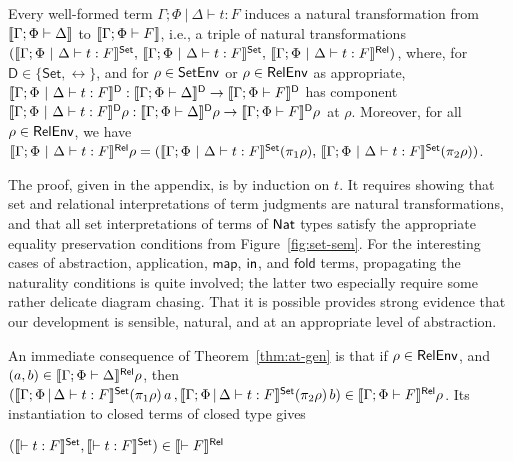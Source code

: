 \documentclass[runningheads]{llncs}
\newcommand{\set}{\mathsf{Set}}
\newcommand{\map}{\mathsf{map}}
\begin{document}
\vspace*{-0.05in}

\begin{theorem}\label{thm:at-gen}
Every well-formed term $\Gamma;\Phi~|~\Delta \vdash t : F$ induces a
natural transformation from $\llbracket{\Gamma; \Phi \vdash \Delta}\rrbracket$ to
$\llbracket{\Gamma; \Phi \vdash F}\rrbracket$, i.e., a triple of natural
transformations $(\setsem{\Gamma;\Phi~|~\Delta \vdash t : F},\,
\setsem{\Gamma;\Phi~|~\Delta \vdash t : F},\,
\relsem{\Gamma;\Phi~|~\Delta \vdash t : F})$, where, for $\mathsf D
\in \{\set,\rel\}$, and for $\rho \in \mathsf{SetEnv}$ or $\rho \in \mathsf{RelEnv}$ as
appropriate, $\llbracket{\Gamma;\Phi~|~\Delta \vdash t : F}\rrbracket^{\mathsf D} :
\llbracket{\Gamma; \Phi \vdash \Delta}\rrbracket^{\mathsf D} \to \llbracket{\Gamma; \Phi
  \vdash F}\rrbracket^{\mathsf D}$ has component $\llbracket{\Gamma;\Phi~|~\Delta
  \vdash t : F}\rrbracket^{\mathsf D}\rho : \llbracket{\Gamma; \Phi \vdash
  \Delta}\rrbracket^{\mathsf D}\rho \to \llbracket{\Gamma; \Phi \vdash F}\rrbracket^{\mathsf
  D}\rho$ at $\rho$. Moreover, for all $\rho \in \mathsf{RelEnv}$, we have
$\relsem{\Gamma;\Phi~|~\Delta \vdash t : F}\rho =
(\setsem{\Gamma;\Phi~|~\Delta \vdash t : F}(\pi_1 \rho),\,
\setsem{\Gamma;\Phi~|~\Delta \vdash t : F}(\pi_2 \rho))$.

\vspace*{-0.05in}

\end{theorem}
The proof, given in the appendix, is by induction on $t$. It requires
showing that set and relational interpretations of term judgments are
natural transformations, and that all set interpretations of terms of
$\mathsf{Nat}$ types satisfy the appropriate equality preservation conditions
from Figure~\ref{fig:set-sem}.  For the interesting cases of
abstraction, application, $\map$, $\mathsf{in}$, and $\mathsf{fold}$ terms,
propagating the naturality conditions is quite involved; the latter
two especially require some rather delicate diagram chasing. That it
is possible provides strong evidence that our development is sensible,
natural, and at an appropriate level of abstraction.

An immediate consequence of Theorem~\ref{thm:at-gen} is that
if $\rho \in \mathsf{RelEnv}$, and \,$(a, b) \in \llbracket{\Gamma; \Phi \vdash
  \Delta}\rrbracket^{\mathsf{Rel}} \rho$, then $(\setsem{\Gamma; \Phi \,|\, \Delta \vdash t :
  F} (\pi_1 \rho) \,a \, , \setsem{\Gamma; \Phi \,|\, \Delta \vdash t
  : F } (\pi_2 \rho) \,b) \in \relsem{\Gamma; \Phi \vdash F} \rho$. 
Its instantiation to closed terms of closed type gives

\begin{theorem}\label{thm:abstraction}
  $(\setsem{\vdash t : F},\setsem{\vdash t
  : F}) \in \relsem{\vdash F}$
\end{theorem}
\end{document}
